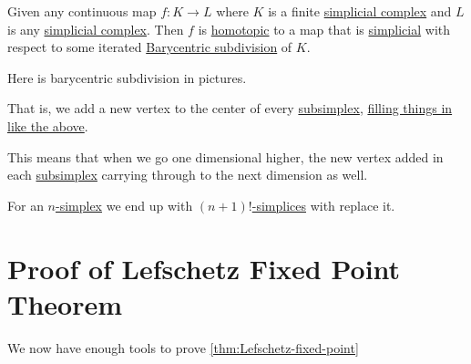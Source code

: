 \begin{theorem}\label{thm:simplicial-approximation-theorem}
	Given any continuous map \(f \colon K \to L\) where \(K\) is a finite \hyperref[def:simplicial-complex]{simplicial complex} and \(L\) is any \hyperref[def:simplicial-complex]{simplicial complex}. Then \(f\) is \hyperref[def:homotopic]{homotopic} to a map that is \hyperref[def:simplicial-map]{simplicial} with respect to some iterated \hyperref[eg:Barycentric-subdivision]{Barycentric subdivision} of \(K\).
\end{theorem}

\begin{eg}\label{eg:Barycentric-subdivision}
	Here is barycentric subdivision in pictures.
	\begin{figure}[H]
		\centering
		\label{fig:eg:barycentric-subdivision}
	\end{figure}
	That is, we add a new vertex to the center of every \hyperref[def:subsimplex]{subsimplex}, \underline{filling things in like the above}.
	\begin{note}
		This means that when we go one dimensional higher, the new vertex added in each \hyperref[def:subsimplex]{subsimplex} carrying through to the next dimension as well.
	\end{note}

	For an \hyperref[def:standard-simplex]{\(n\)-simplex} we end up with \hyperref[def:standard-simplex]{\((n + 1)!\)-simplices} with replace it.
\end{eg}

\section{Proof of Lefschetz Fixed Point Theorem}
We now have enough tools to prove \autoref{thm:Lefschetz-fixed-point}

